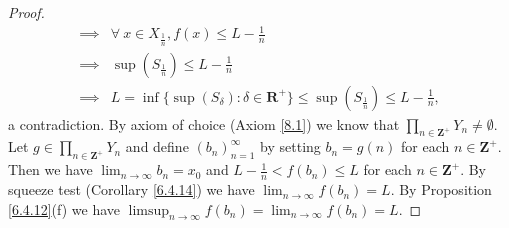 \begin{proof}
\begin{align*}
        \implies & \forall\ x \in X_{\frac{1}{n}}, f(x) \leq L - \frac{1}{n}                                               \\
        \implies & \sup(S_{\frac{1}{n}}) \leq L - \frac{1}{n}                                                              \\
        \implies & L = \inf\{\sup(S_{\delta}) : \delta \in \mathbf{R}^+\} \leq \sup(S_{\frac{1}{n}}) \leq L - \frac{1}{n},
    \end{align*}
    a contradiction.
    By axiom of choice (Axiom \ref{8.1}) we know that \(\prod_{n \in \mathbf{Z}^+} Y_n \neq \emptyset\).
    Let \(g \in \prod_{n \in \mathbf{Z}^+} Y_n\) and define \((b_n)_{n = 1}^\infty\) by setting \(b_n = g(n)\) for each \(n \in \mathbf{Z}^+\).
    Then we have \(\lim_{n \to \infty} b_n = x_0\) and \(L - \frac{1}{n} < f(b_n) \leq L\) for each \(n \in \mathbf{Z}^+\).
    By squeeze test (Corollary \ref{6.4.14}) we have \(\lim_{n \to \infty} f(b_n) = L\).
    By Proposition \ref{6.4.12}(f) we have \(\limsup_{n \to \infty} f(b_n) = \lim_{n \to \infty} f(b_n) = L\).


\end{proof}

